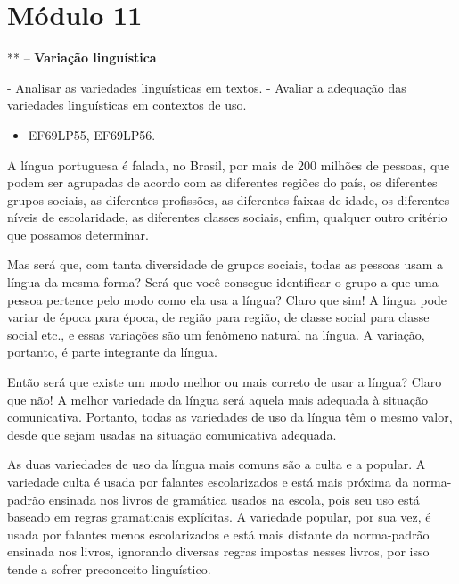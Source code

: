 \hypertarget{muxf3dulo-11}{%
\section{Módulo 11}\label{muxf3dulo-11}}

** -- \textbf{Variação linguística}


- Analisar as variedades linguísticas em
textos. - Avaliar a adequação das variedades linguísticas em contextos
de uso.


\begin{itemize}
\tightlist
\item
  EF69LP55, EF69LP56.
\end{itemize}

A língua portuguesa é falada, no Brasil, por mais de 200 milhões de
pessoas, que podem ser agrupadas de acordo com as diferentes regiões do
país, os diferentes grupos sociais, as diferentes profissões, as
diferentes faixas de idade, os diferentes níveis de escolaridade, as
diferentes classes sociais, enfim, qualquer outro critério que possamos
determinar.

Mas será que, com tanta diversidade de grupos sociais, todas as pessoas
usam a língua da mesma forma? Será que você consegue identificar o grupo
a que uma pessoa pertence pelo modo como ela usa a língua? Claro que
sim! A língua pode variar de época para época, de região para região, de
classe social para classe social etc., e essas variações são um fenômeno
natural na língua. A variação, portanto, é parte integrante da língua.

Então será que existe um modo melhor ou mais correto de usar a língua?
Claro que não! A melhor variedade da língua será aquela mais adequada à
situação comunicativa. Portanto, todas as variedades de uso da língua
têm o mesmo valor, desde que sejam usadas na situação comunicativa
adequada.

As duas variedades de uso da língua mais comuns são a culta e a popular.
A variedade culta é usada por falantes escolarizados e está mais próxima
da norma-padrão ensinada nos livros de gramática usados na escola, pois
seu uso está baseado em regras gramaticais explícitas. A variedade
popular, por sua vez, é usada por falantes menos escolarizados e está
mais distante da norma-padrão ensinada nos livros, ignorando diversas
regras impostas nesses livros, por isso tende a sofrer preconceito
linguístico.

